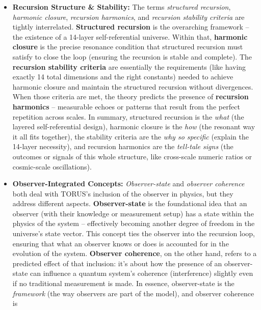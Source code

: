 \documentclass[
]{article}
\begin{document}
{\begin{itemize}
\item
  \textbf{Recursion Structure \& Stability:} The terms \emph{structured
  recursion}, \emph{harmonic closure}, \emph{recursion harmonics}, and
  \emph{recursion stability criteria} are tightly interrelated.
  \textbf{Structured recursion} is the overarching framework -- the
  existence of a 14-layer self-referential universe. Within that,
  \textbf{harmonic closure} is the precise resonance condition that
  structured recursion must satisfy to close the loop (ensuring the
  recursion is stable and complete). The \textbf{recursion stability
  criteria} are essentially the requirements (like having exactly 14
  total dimensions and the right constants) needed to achieve harmonic
  closure and maintain the structured recursion without
  divergences\hspace{0pt}. When those criteria are met, the theory
  predicts the presence of \textbf{recursion harmonics} -- measurable
  echoes or patterns that result from the perfect repetition across
  scales. In summary, structured recursion is the \emph{what} (the
  layered self-referential design), harmonic closure is the \emph{how}
  (the resonant way it all fits together), the stability criteria are
  the \emph{why so specific} (explain the 14-layer necessity), and
  recursion harmonics are the \emph{tell-tale signs} (the outcomes or
  signals of this whole structure, like cross-scale numeric ratios or
  cosmic-scale oscillations).
\item
  \textbf{Observer-Integrated Concepts:} \emph{Observer-state} and
  \emph{observer coherence} both deal with TORUS's inclusion of the
  observer in physics, but they address different aspects.
  \textbf{Observer-state} is the foundational idea that an observer
  (with their knowledge or measurement setup) has a state within the
  physics of the system -- effectively becoming another degree of
  freedom in the universe's state vector\hspace{0pt}. This concept ties
  the observer into the recursion loop, ensuring that what an observer
  knows or does is accounted for in the evolution of the system.
  \textbf{Observer coherence}, on the other hand, refers to a predicted
  effect of that inclusion: it's about how the presence of an
  observer-state can influence a quantum system's coherence
  (interference) slightly even if no traditional measurement is
  made\hspace{0pt}. In essence, observer-state is the \emph{framework}
  (the way observers are part of the model), and observer coherence is

\end{itemize}}
\end{document}
